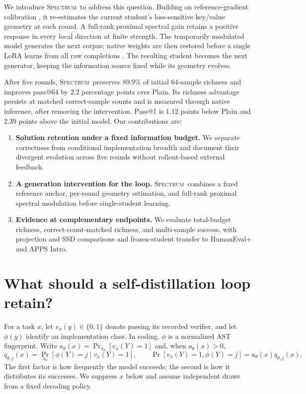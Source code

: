 \documentclass{article}
\newcommand{\method}{\textsc{Spectrum}}
\begin{document}
We introduce \method\ to address this question. Building on reference-gradient calibration \citep{hao2026spd}, it re-estimates the current student's loss-sensitive key/value geometry at each round. A full-rank proximal spectral gain retains a positive response in every local direction at finite strength. The temporarily modulated model generates the next corpus; native weights are then restored before a single LoRA learns from all raw completions \citep{hu2022lora}. The resulting student becomes the next generator, keeping the information source fixed while its geometry evolves.

After five rounds, \method\ preserves $89.9\%$ of initial 64-sample richness and improves pass@64 by $2.2$ percentage points over Plain. Its richness advantage persists at matched correct-sample counts and is measured through native inference, after removing the intervention. Pass@1 is $1.12$ points below Plain and $2.39$ points above the initial model. Our contributions are:
\begin{enumerate}
\item \textbf{Solution retention under a fixed information budget.} We separate correctness from conditional implementation breadth and document their divergent evolution across five rounds without rollout-based external feedback.
\item \textbf{A generation intervention for the loop.} \method\ combines a fixed reference anchor, per-round geometry estimation, and full-rank proximal spectral modulation before single-student learning.
\item \textbf{Evidence at complementary endpoints.} We evaluate total-budget richness, correct-count-matched richness, and multi-sample success, with projection and SSD comparisons and frozen-student transfer to HumanEval+ and APPS Intro.
\end{enumerate}

\section{What should a self-distillation loop retain?}
\label{sec:problem}
For a task $x$, let $v_x(y)\in\{0,1\}$ denote passing its recorded verifier, and let $\phi(y)$ identify an implementation class. In coding, $\phi$ is a normalized AST fingerprint. Write $a_\theta(x)=\Pr_{\pi_\theta}[v_x(Y)=1]$ and, when $a_\theta(x)>0$,
\begin{equation}
q_{\theta,j}(x)=\Pr_{\pi_\theta}[\phi(Y)=j\mid v_x(Y)=1],\qquad
\Pr[v_x(Y)=1,\phi(Y)=j]=a_\theta(x)q_{\theta,j}(x).
\label{eq:factor}
\end{equation}
The first factor is how frequently the model succeeds; the second is how it distributes its successes. We suppress $x$ below and assume independent draws from a fixed decoding policy.
\end{document}
